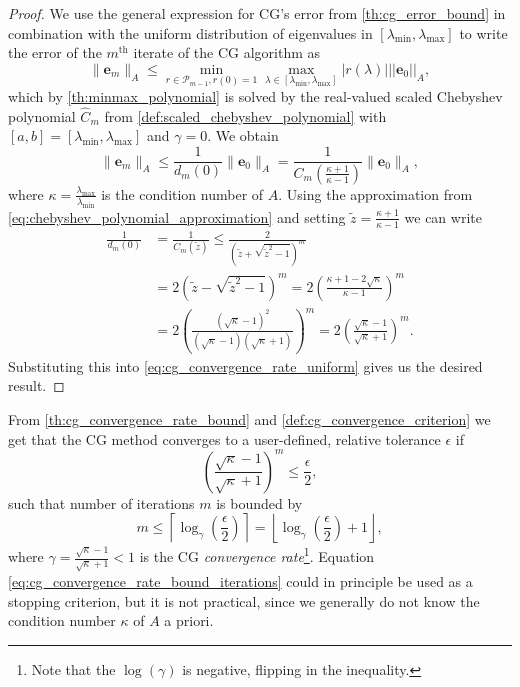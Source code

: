 \begin{proof}
  We use the general expression for CG's error from \cref{th:cg_error_bound} in combination with the uniform distribution of eigenvalues in $[\lambda_{\text{min}}, \lambda_{\text{max}}]$ to write the error of the $m^{\text{th}}$ iterate of the CG algorithm as
  \begin{equation}
    \|\mathbf{e}_m\|_A \leq \min_{r \in \mathcal{P}_{m-1}, r(0) = 1} \max_{\lambda \in [\lambda_{\text{min}}, \lambda_{\text{max}}]} |r(\lambda)| ||\mathbf{e}_0||_A,
  \end{equation}
  which by \cref{th:minmax_polynomial} is solved by the real-valued scaled Chebyshev polynomial $\hat{C}_m$ from \cref{def:scaled_chebyshev_polynomial} with $[a,b] = [\lambda_{\text{min}},\lambda_{\text{max}}]$ and $\gamma=0$. We obtain
  \begin{equation}
    \|\mathbf{e}_m\|_A \leq \frac{1}{d_m(0)}\|\mathbf{e}_0\|_A =\frac{1}{C_m(\frac{\kappa + 1}{\kappa - 1})}\|\mathbf{e}_0\|_A,
    \label{eq:cg_convergence_rate_uniform}
  \end{equation}
  where $\kappa = \frac{\lambda_{\text{max}}}{\lambda_{\text{min}}}$ is the condition number of $A$. Using the approximation from \cref{eq:chebyshev_polynomial_approximation} and setting $\tilde{z} = \frac{\kappa + 1}{\kappa -1}$ we can write
  \begin{align*}
    \frac{1}{d_m(0)} & = \frac{1}{C_m(\tilde{z})} \leq \frac{2}{\left(\tilde{z} + \sqrt{\tilde{z}^2-1}\right)^m}                                                             \\
                     & =2\left(\tilde{z} - \sqrt{\tilde{z}^2-1}\right)^m =2\left(\frac{\kappa + 1 - 2\sqrt{\kappa}}{\kappa - 1}\right)^m                                     \\
                     & =2\left(\frac{(\sqrt{\kappa} - 1)^2}{(\sqrt{\kappa} - 1)(\sqrt{\kappa} + 1)}\right)^m =2\left(\frac{\sqrt{\kappa} - 1}{\sqrt{\kappa} + 1}\right)^{m}.
  \end{align*}
  Substituting this into \cref{eq:cg_convergence_rate_uniform} gives us the desired result.
\end{proof}
From \cref{th:cg_convergence_rate_bound} and \cref{def:cg_convergence_criterion} we get that the CG method converges to a user-defined, relative tolerance $\epsilon$ if
\begin{equation*}
  \left(\frac{\sqrt{\kappa} - 1}{\sqrt{\kappa} + 1}\right)^{m} \leq \frac{\epsilon}{2},
\end{equation*}
such that number of iterations $m$ is bounded by
\begin{equation}
  m \leq \left\lceil\log_{\gamma}\left(\frac{\epsilon}{2}\right)\right\rceil = \left\lfloor\log_{\gamma}\left(\frac{\epsilon}{2}\right) + 1\right\rfloor,
  \label{eq:cg_convergence_rate_bound_iterations}
\end{equation}
where $\gamma = \frac{\sqrt{\kappa} - 1}{\sqrt{\kappa} + 1} < 1$ is the CG \textit{convergence rate}\footnote{Note that the $\log(\gamma)$ is negative, flipping in the inequality.}. Equation \ref{eq:cg_convergence_rate_bound_iterations} could in principle be used as a stopping criterion, but it is not practical, since we generally do not know the condition number $\kappa$ of $A$ a priori.


